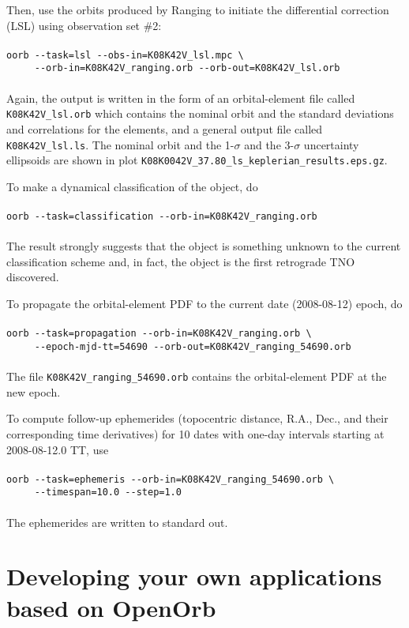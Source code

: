 \documentclass[12pt,english,twoside,a4paper]{report}
\begin{document}
Then, use the orbits produced by Ranging to initiate the differential
correction (LSL) using observation set \#2: \\ \\ 
\verb|oorb --task=lsl --obs-in=K08K42V_lsl.mpc \| \\
\verb|     --orb-in=K08K42V_ranging.orb --orb-out=K08K42V_lsl.orb| \\ \\ 
Again, the output is written in the form of an orbital-element file
called \verb|K08K42V_lsl.orb| which contains the nominal orbit and the
standard deviations and correlations for the elements, and a general
output file called \verb|K08K42V_lsl.ls|. The nominal orbit and the
1-$\sigma$ and the 3-$\sigma$ uncertainty ellipsoids are shown in plot
\verb|K08K0042V_37.80_ls_keplerian_results.eps.gz|.

To make a dynamical classification of the object, do \\ \\
\verb|oorb --task=classification --orb-in=K08K42V_ranging.orb| \\ \\
The result strongly suggests that the object is something unknown to
the current classification scheme and, in fact, the object is the
first retrograde TNO discovered.

To propagate the orbital-element PDF to the current date
(2008-08-12) epoch, do \\ \\ 
\verb|oorb --task=propagation --orb-in=K08K42V_ranging.orb \| \\ 
\verb|     --epoch-mjd-tt=54690 --orb-out=K08K42V_ranging_54690.orb| \\ \\ 
The file \verb|K08K42V_ranging_54690.orb| contains the orbital-element
PDF at the new epoch.

To compute follow-up ephemerides (topocentric distance, R.A., Dec.,
and their corresponding time derivatives) for 10 dates with one-day
intervals starting at 2008-08-12.0 TT, use \\ \\
\verb|oorb --task=ephemeris --orb-in=K08K42V_ranging_54690.orb \| \\ 
\verb|     --timespan=10.0 --step=1.0| \\ \\ 
The ephemerides are written to standard out.

\chapter{Developing your own applications based on OpenOrb}
\end{document}
